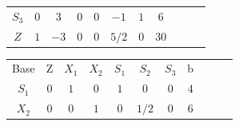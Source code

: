 \begin{frame}
{\begin{table}
\begin{tabular}{c c c c c c c c c c c}
				\cline{1-8} 
				\cellcolor{blue!100} \color{red} $\scriptstyle S_3$
				& \cellcolor{yellow!50} $\scriptstyle 0$
				& \cellcolor{yellow!50} $\scriptstyle 3$
				& \cellcolor{yellow!50} $\scriptstyle 0$
				& \cellcolor{yellow!50} $\scriptstyle 0$
				& \cellcolor{yellow!50} $\scriptstyle -1$
				& \cellcolor{yellow!50} $\scriptstyle 1$
				& \cellcolor{yellow!50} $\scriptstyle 6$
				&
				&
				& \\
				\cline{1-8}
				\cellcolor{blue!100} \color{white} $\scriptstyle Z$
				& \cellcolor{yellow!50} $\scriptstyle 1$
				& \cellcolor{yellow!50} $\scriptstyle -3$
				& \cellcolor{yellow!50} $\scriptstyle 0$
				& \cellcolor{yellow!50} $\scriptstyle 0$
				& \cellcolor{yellow!50} $\scriptstyle 5/2$
				& \cellcolor{yellow!50} $\scriptstyle 0$
				& \cellcolor{yellow!50} $\scriptstyle 30$ 
				&
				&
				& \\
				\cline{1-8}
			\end{tabular}
		\end{table}			
	}	
	{		
		\begin{table}		
			\begin{tabular}{c c c c c c c c c c c}
				\cline{1-8} 
				\cellcolor{blue!100} \color{white} \scriptsize Base 
				&\cellcolor{blue!100} \color{white} \scriptsize Z 
				&\cellcolor{blue!100} \color{white} $\scriptstyle X_1$ 
				&\cellcolor{blue!100} \color{red} $\scriptstyle X_2$ 
				&\cellcolor{blue!100} \color{red} $\scriptstyle S_1$ 
				&\cellcolor{blue!100} \color{white} $\scriptstyle S_2$ 
				&\cellcolor{blue!100} \color{red} $\scriptstyle S_3$ 
				&\cellcolor{blue!100} \color{white} \scriptsize b
				&
				&
				& \\
				\cline{1-8}
				\cellcolor{blue!100} \color{red} $\scriptstyle S_1$
				& \cellcolor{yellow!50} $\scriptstyle 0$
				& \cellcolor{gray!50} $\scriptstyle 1$
				& \cellcolor{yellow!50} $\scriptstyle 0$
				& \cellcolor{yellow!50} $\scriptstyle 1$
				& \cellcolor{yellow!50} $\scriptstyle 0$
				& \cellcolor{yellow!50} $\scriptstyle 0$
				& \cellcolor{yellow!50} $\scriptstyle 4$
				&
				&
				& \\
				\cline{1-8} 
			    \cellcolor{blue!100} \color{red} $\scriptstyle X_2$
				& \cellcolor{yellow!50} $\scriptstyle 0$
				& \cellcolor{gray!50} $\scriptstyle 0$
				& \cellcolor{yellow!50} $\scriptstyle 1$
				& \cellcolor{yellow!50} $\scriptstyle 0$			
				& \cellcolor{yellow!50} $\scriptstyle 1/2$
				& \cellcolor{yellow!50} $\scriptstyle 0$
				& \cellcolor{yellow!50} $\scriptstyle 6$
				&
				&
				& \\

\end{tabular}
\end{table}}
\end{frame}

